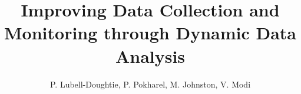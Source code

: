 \documentclass{acm_proc_article-sp}
\begin{document}
\title{Improving Data Collection and Monitoring through Dynamic Data Analysis}
\subtitle{}
%
%
%
%
%

%
\author{
%
%
\alignauthor
P. Lubell-Doughtie, P. Pokharel, M. Johnston, V. Modi\\
       \\
       \\
}
\end{document}
